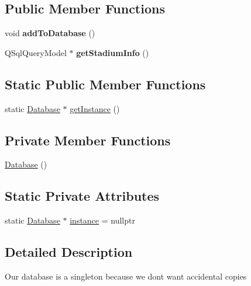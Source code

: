 \subsection*{Public Member Functions}
\begin{DoxyCompactItemize}
\item 
\mbox{\label{class_database_a76a9b0363174bdd6c70a052a088cfaf8}} 
void {\bfseries add\+To\+Database} ()
\item 
\mbox{\label{class_database_a94df9dbb511243da5a288eefc17348cb}} 
Q\+Sql\+Query\+Model $\ast$ {\bfseries get\+Stadium\+Info} ()
\end{DoxyCompactItemize}
\subsection*{Static Public Member Functions}
\begin{DoxyCompactItemize}
\item 
static \hyperlink{class_database}{Database} $\ast$ \hyperlink{class_database_a5a3b028f980a577ea0b809eb92312761}{get\+Instance} ()
\end{DoxyCompactItemize}
\subsection*{Private Member Functions}
\begin{DoxyCompactItemize}
\item 
\hyperlink{class_database_a4703c80e6969d33565ea340f768fdadf}{Database} ()
\end{DoxyCompactItemize}
\subsection*{Static Private Attributes}
\begin{DoxyCompactItemize}
\item 
static \hyperlink{class_database}{Database} $\ast$ \hyperlink{class_database_a5926460fe1c15c95d470fcde637f8d22}{instance} = nullptr
\end{DoxyCompactItemize}


\subsection{Detailed Description}
Our database is a singleton because we dont want accidental copies 

